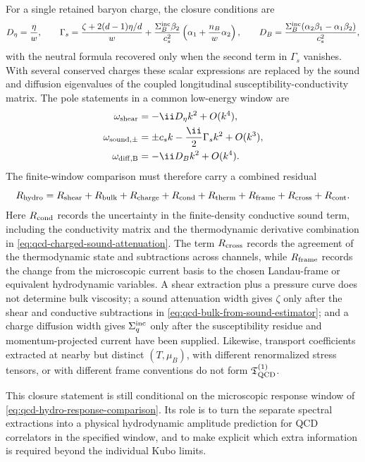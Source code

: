 \begin{controlledapproximation}
For a single retained baryon charge, the closure conditions are
\begin{equation}
  D_\eta=\frac{\eta}{w},
  \qquad
  \Gamma_s
  =
  \frac{\zeta+2(d-1)\eta/d}{w}
  +
  \frac{\Sigma_B^{\rm inc}\beta_2}{c_s^2}
  \left(\alpha_1+\frac{n_B}{w}\alpha_2\right),
  \qquad
  D_B
  =
  \frac{\Sigma_B^{\rm inc}(\alpha_2\beta_1-\alpha_1\beta_2)}
       {c_s^2},
  \label{eq:qcd-transport-closure-diffusivities}
\end{equation}
with the neutral formula recovered only when the second term in \(\Gamma_s\)
vanishes.  With several conserved charges these scalar expressions are
replaced by the sound and diffusion eigenvalues of the coupled longitudinal
susceptibility-conductivity matrix.  The pole statements in a common
low-energy window are
\begin{align}
  \omega_{\rm shear}
  &=
  -\ii D_\eta k^2+O(k^4),
  \nonumber\\
  \omega_{\rm sound,\pm}
  &=
  \pm c_s k-\frac{\ii}{2}\Gamma_s k^2+O(k^3),
  \nonumber\\
  \omega_{\rm diff,B}
  &=
  -\ii D_B k^2+O(k^4).
  \label{eq:qcd-transport-closure-poles}
\end{align}
The finite-window comparison must therefore carry a combined residual
\begin{equation}
  R_{\rm hydro}
  =
  R_{\rm shear}
  +R_{\rm bulk}
  +R_{\rm charge}
  +R_{\rm cond}
  +R_{\rm therm}
  +R_{\rm frame}
  +R_{\rm cross}
  +R_{\rm cont}.
  \label{eq:qcd-transport-closure-residual}
\end{equation}
Here \(R_{\rm cond}\) records the uncertainty in the finite-density conductive
sound term, including the conductivity matrix and the thermodynamic derivative
combination in \eqref{eq:qcd-charged-sound-attenuation}.  The term
\(R_{\rm cross}\) records the agreement of the thermodynamic state and
subtractions across channels, while \(R_{\rm frame}\) records the change from
the microscopic current basis to the chosen Landau-frame or equivalent
hydrodynamic variables.  A shear extraction plus a pressure curve does not
determine bulk viscosity; a sound attenuation width gives \(\zeta\) only
after the shear and conductive subtractions in
\eqref{eq:qcd-bulk-from-sound-estimator}; and a charge diffusion width gives
\(\Sigma_q^{\rm inc}\) only after the susceptibility residue and
momentum-projected current have been supplied.  Likewise, transport
coefficients extracted at nearby but distinct \((T,\mu_B)\), with different
renormalized stress tensors, or with different frame conventions do not form
\(\mathfrak T_{\rm QCD}^{(1)}\).

This closure statement is still conditional on the microscopic response
window of \eqref{eq:qcd-hydro-response-comparison}.  Its role is to turn the
separate spectral extractions into a physical hydrodynamic amplitude
prediction for QCD correlators in the specified window, and to make explicit
which extra information is required beyond the individual Kubo limits.
\end{controlledapproximation}

